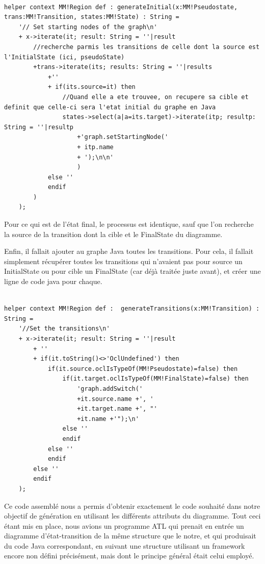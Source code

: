 \documentclass[french, 12pt, a4paper]{article}
\begin{document}
  \begin{lstlisting}[caption={Création de l'état initial du graphe correspondant à l'état entrant du diagramme.},basicstyle=\small]

helper context MM!Region def : generateInitial(x:MM!Pseudostate, trans:MM!Transition, states:MM!State) : String =
	'// Set starting nodes of the graph\n'
	+ x->iterate(it; result: String = ''|result
	    //recherche parmis les transitions de celle dont la source est l'InitialState (ici, pseudoState)
		+trans->iterate(its; results: String = ''|results
			+''
			+ if(its.source=it) then 
			    //Quand elle a ete trouvee, on recupere sa cible et definit que celle-ci sera l'etat initial du graphe en Java
				states->select(a|a=its.target)->iterate(itp; resultp: String = ''|resultp
					+'graph.setStartingNode('
					+ itp.name
					+ ');\n\n'
					)
			else '' 
			endif
		)
	);

    \end{lstlisting}
    
Pour ce qui est de l'état final, le processus est identique, sauf que l'on recherche la source de la transition dont la cible et le FinalState du diagramme.

Enfin, il fallait ajouter au graphe Java toutes les transitions. Pour cela, il fallait simplement récupérer toutes les transitions qui n'avaient pas pour source un InitialState ou pour cible un FinalState (car déjà traitée juste avant), et créer une ligne de code java pour chaque. 

  \begin{lstlisting}[caption={Création des transitions dans le grpahe Java en utilisant les transitions du diagramme},basicstyle=\small]

helper context MM!Region def :  generateTransitions(x:MM!Transition) : String = 
	'//Set the transitions\n'
	+ x->iterate(it; result: String = ''|result
		+ ''
		+ if(it.toString()<>'OclUndefined') then 
			if(it.source.oclIsTypeOf(MM!Pseudostate)=false) then
				if(it.target.oclIsTypeOf(MM!FinalState)=false) then
    				'graph.addSwitch('
    				+it.source.name +', '
					+it.target.name +', "'
					+it.name +'");\n'
				else '' 
				endif
			else '' 
			endif
		else '' 
		endif
	);

    \end{lstlisting}

Ce code assemblé nous a permis d'obtenir exactement le code souhaité dans notre objectif de génération en utilisant les différents attributs du diagramme.     
Tout ceci étant mis en place, nous avions un programme ATL qui prenait en entrée un diagramme d'état-transition de la même structure que le notre, et qui produisait du code Java correspondant, en suivant une structure utilisant un framework encore non défini précisément, mais dont le principe général était celui employé. 
\end{document}
